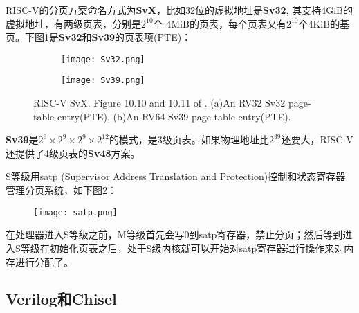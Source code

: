 \begin{itemize}
	RISC-V的分页方案命名方式为\textbf{SvX}，比如32位的虚拟地址是\textbf{Sv32}, 其支持4GiB的虚拟地址，有两级页表，分别是$ 2^{10} $个 4MiB的页表，每个页表又有$ 2^{10} $个4KiB的基页。下图\ref{fig:SvX}是\textbf{Sv32}和\textbf{Sv39}的页表项(PTE)：
	\begin{figure}[!htbp]
		\centering
		\begin{subfigure}[b]{0.7\textwidth}
			\texttt{[image: Sv32.png]}
			\caption{}
		\end{subfigure}%
		
		\begin{subfigure}[b]{\textwidth}
			\texttt{[image: Sv39.png]}
			\caption{}
		\end{subfigure}%
		{RISC-V SvX. Figure 10.10 and 10.11 of \citep{Patterson:2017:RRO:3202479}. (a)An RV32 Sv32 page-table entry(PTE), (b)An RV64 Sv39 page-table entry(PTE).}
		\label{fig:SvX}
	\end{figure}
	\textbf{Sv39}是$ 2^9\times 2^9\times 2^9 \times 2^{12} $的模式，是3级页表。如果物理地址比$ 2^{39} $还要大，RISC-V还提供了4级页表的\textbf{Sv48}方案。
	
	S等级用satp (Supervisor Address Translation and Protection)控制和状态寄存器管理分页系统，如下图\ref{fig:satp}：
	\begin{figure}[!htbp]
		\centering
		\texttt{[image: satp.png]}
		\label{fig:satp}
	\end{figure}
	在处理器进入S等级之前，M等级首先会写0到satp寄存器，禁止分页；然后等到进入S等级在初始化页表之后，处于S级内核就可以开始对satp寄存器进行操作来对内存进行分配了。
\end{itemize}

\subsection{Verilog和Chisel}

